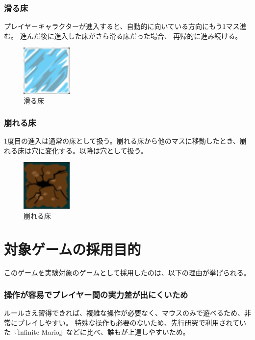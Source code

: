 \subsubsection{滑る床}
プレイヤーキャラクターが進入すると、自動的に向いている方向にもう1マス進む。
進んだ後に進入した床がさら滑る床だった場合、
再帰的に進み続ける。

\begin{figure}[htbp]
  \begin{center}
    \includegraphics[bb=0 0 24 24, width=2.5cm]{images/ice.png}
  \end{center}
  \caption{滑る床}
  \label{fig:one}
\end{figure}

\subsubsection{崩れる床}
1度目の進入は通常の床として扱う。崩れる床から他のマスに移動したとき、崩れる床は穴に変化する。以降は穴として扱う。

\begin{figure}[htbp]
  \begin{center}
    \includegraphics[bb=0 0 24 24, width=2.5cm]{images/broken.png}
  \end{center}
  \caption{崩れる床}
  \label{fig:one}
\end{figure}

\section{対象ゲームの採用目的}
このゲームを実験対象のゲームとして採用したのは、以下の理由が挙げられる。
\subsubsection{操作が容易でプレイヤー間の実力差が出にくいため}
ルールさえ習得できれば、複雑な操作が必要なく、マウスのみで遊べるため、非常にプレイしやすい。
特殊な操作も必要のないため、先行研究で利用されていた『Infinite Mario』などに比べ、誰もが上達しやすいため。
